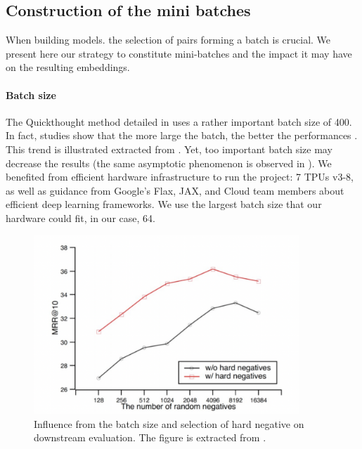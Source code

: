 \subsection{Construction of the mini batches}

When building models. the selection of pairs forming a batch is crucial. We present here our strategy to constitute mini-batches and the impact it may have on the resulting embeddings.

\paragraph{Batch size} The Quickthought method detailed in  uses a rather important batch size of 400. In fact, studies show that the more large the batch, the better the performances  \parencite{chen_20a, qu_21}. This trend is illustrated  extracted from \textcite{qu_21}. Yet, too important batch size may decrease the results (the same asymptotic phenomenon is observed in \textcite{chen_20a}). We benefited from efficient hardware infrastructure to run the project: 7 TPUs v3-8, as well as guidance from Google’s Flax, JAX, and Cloud team members about efficient deep learning frameworks. We use the largest batch size that our hardware could fit, in our case, 64.

\begin{figure}[htb!]
	\includegraphics[width=10cm]{images/batch-size.png}
	\caption[Batch size]{Influence from the batch size and selection of hard negative on downstream evaluation. The figure is extracted from \textcite{qu_21}.}
\end{figure}

